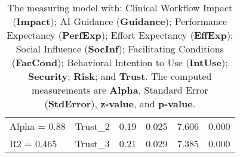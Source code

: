 \begin{table}[htpb]
{\begin{tabular}{llrrrl}
Alpha = 0.88                & Trust\_2    & 0.19                      & 0.025                        & 7.606                       & 0.000   \\
R2 = 0.465                  & Trust\_3    & 0.21                      & 0.029                        & 7.385                       & 0.000  \\ \hline
\end{tabular}%
}
\caption{The measuring model with: Clinical Workflow Impact ({\bf Impact}); AI Guidance ({\bf Guidance}); Performance Expectancy ({\bf PerfExp}); Effort Expectancy ({\bf EffExp}); Social Influence ({\bf SocInf}); Facilitating Conditions ({\bf FacCond}); Behavioral Intention to Use ({\bf IntUse}); {\bf Security}; {\bf Risk}; and {\bf Trust}. The computed measurements are {\bf Alpha}, Standard Error ({\bf StdError}), {\bf z-value}, and {\bf p-value}.}
\label{tab:tab010}
\end{table}